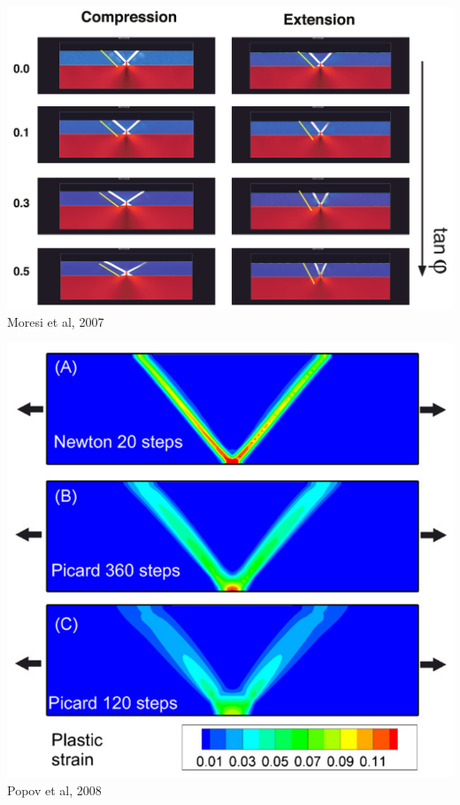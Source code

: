 \begin{center}
\begin{minipage}{0.45\textwidth}
\centering
\includegraphics[height=0.8\textwidth]{images/benchmark_brick/moml07}\\
{\small Moresi et al, 2007 \cite{moml07}}
\end{minipage}\hfill
\begin{minipage}{0.45\textwidth}
\centering
\includegraphics[height=0.8\textwidth]{images/benchmark_brick/poso08}\\
{\small Popov et al, 2008 \cite{poso08}}
\end{minipage}
\end{center}

